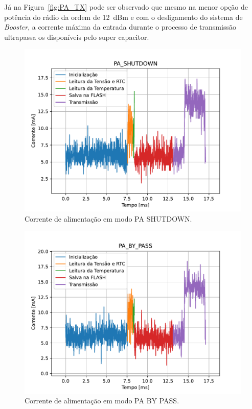 

Já na Figura~\ref{fig:PA_TX} pode ser observado que mesmo na menor opção de potência do rádio da ordem de 12~dBm e com o desligamento do sistema de \textit{Booster}, a corrente máxima da entrada durante o processo de transmissão ultrapassa os \ImaxCap disponíveis pelo super capacitor.


\begin{figure}[h!]
  \caption{Corrente de alimentação em modo PA SHUTDOWN.}
  \begin{center}
      \includegraphics[scale=0.8]{scripts/PA_SHUTDOWN.pdf}
  \end{center}
  \label{fig:PA_SHUTDOWN}
\end{figure}




\begin{figure}[h!]
  \caption{Corrente de alimentação em modo PA BY PASS.}
  \begin{center}
      \includegraphics[scale=0.8]{scripts/PA_BY_PASS.pdf}
  \end{center}
  \label{fig:PA_BY_PASS}
\end{figure}

